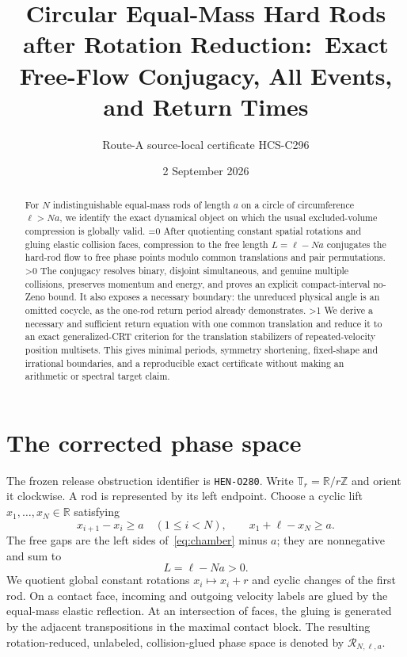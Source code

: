 \documentclass[10pt]{article}
\title{Circular Equal-Mass Hard Rods after Rotation Reduction:\
Exact Free-Flow Conjugacy, All Events, and Return Times}
\author{Route-A source-local certificate HCS-C296}
\date{2 September 2026}
\providecommand{\CRevisionRound}{2}
\newcommand{\R}{\mathbb R}
\newcommand{\Z}{\mathbb Z}
\newcommand{\T}{\mathbb T}
\newcommand{\cR}{\mathcal R}
\begin{document}
\maketitle

\begin{abstract}
For $N$ indistinguishable equal-mass rods of length $a$ on a circle of
circumference $\ell>Na$, we identify the exact dynamical object on which the
usual excluded-volume compression is globally valid.
\ifnum\CRevisionRound=0
After quotienting constant spatial rotations and gluing elastic collision
faces, compression to the free length $L=\ell-Na$ conjugates the hard-rod flow
to free phase points modulo common translations and pair permutations.
\fi
\ifnum\CRevisionRound>0
The conjugacy resolves binary, disjoint simultaneous, and genuine multiple
collisions, preserves momentum and energy, and proves an explicit
compact-interval no-Zeno bound.  It also exposes a necessary boundary: the
unreduced physical angle is an omitted cocycle, as the one-rod return period
already demonstrates.
\fi
\ifnum\CRevisionRound>1
We derive a necessary and sufficient return equation with one common
translation and reduce it to an exact generalized-CRT criterion for the
translation stabilizers of repeated-velocity position multisets.  This gives
minimal periods, symmetry shortening, fixed-shape and irrational boundaries,
and a reproducible exact certificate without making an arithmetic or spectral
target claim.
\fi
\end{abstract}

\section{The corrected phase space}
The frozen release obstruction identifier is \texttt{HEN-O280}.
Write $\T_r=\R/r\Z$ and orient it clockwise.  A rod is represented by its
left endpoint.  Choose a cyclic lift $x_1,\ldots,x_N\in\R$ satisfying
\begin{equation}\label{eq:chamber}
 x_{i+1}-x_i\geq a\quad(1\leq i<N),
 \qquad x_1+\ell-x_N\geq a .
\end{equation}
The free gaps are the left sides of~\eqref{eq:chamber} minus $a$; they are
nonnegative and sum to
\[
 L=\ell-Na>0.
\]
We quotient global constant rotations $x_i\mapsto x_i+r$ and cyclic changes
of the first rod.  On a contact face, incoming and outgoing velocity labels
are glued by the equal-mass elastic reflection.  At an intersection of faces,
the gluing is generated by the adjacent transpositions in the maximal contact
block.  The resulting rotation-reduced, unlabeled, collision-glued phase
space is denoted by $\cR_{N,\ell,a}$.
\end{document}
